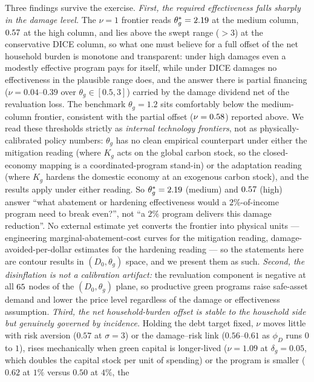 \documentclass[12pt]{article}
\begin{document}
Three findings survive the exercise. \emph{First, the required
effectiveness falls sharply in the damage level.} The $\nu=1$ frontier reads
$\theta_g^{*}=2.19$ at the medium column, $0.57$ at the
\citet{bilalkanzig2024} high column, and lies above the swept range
($>3$) at the conservative DICE column, so what one must believe for a full
offset of the net household burden is monotone and transparent: under high damages even a
modestly effective program pays for itself, while under DICE damages no
effectiveness in the plausible range does, and the answer there is
partial financing ($\nu=0.04$--$0.39$ over $\theta_g\in[0.5,3]$) carried by
the damage dividend net of the revaluation loss. The benchmark $\theta_g=1.2$
sits comfortably below the medium-column frontier, consistent with the
partial offset ($\nu=0.58$) reported above. We read these
thresholds strictly as \emph{internal technology frontiers}, not as
physically-calibrated policy numbers: $\theta_g$ has no clean empirical
counterpart under either the mitigation reading (where $K_g$ acts on the global
carbon stock, so the closed-economy mapping is a coordinated-program stand-in)
or the adaptation reading (where $K_g$ hardens the domestic economy at an
exogenous carbon stock), and the results apply under either reading. So
$\theta_g^{*}=2.19$ (medium) and $0.57$ (high) answer
``what abatement or hardening effectiveness would a $2\%$-of-income program
need to break even?'', not ``a $2\%$ program delivers this damage
reduction''. No external estimate yet converts the frontier into physical
units --- engineering marginal-abatement-cost curves for the mitigation
reading, damage-avoided-per-dollar estimates for the hardening reading ---
so the statements here are contour results in $(D_0,\theta_g)$ space, and
we present them as such. \emph{Second, the
disinflation is not a calibration artifact:} the revaluation component is
negative at all $65$
nodes of the $(D_0,\theta_g)$ plane, so productive green programs raise
safe-asset demand and lower the price level regardless of the damage or
effectiveness assumption. \emph{Third, the net household-burden offset is stable to
the household side but genuinely governed by incidence.} Holding the debt
target fixed, $\nu$ moves little with risk aversion ($0.57$ at $\sigma=3$)
or the damage--risk link ($0.56$--$0.61$ as $\phi_D$ runs $0$ to $1$), rises
mechanically when green capital is longer-lived ($\nu=1.09$ at
$\delta_g=0.05$, which doubles the capital stock per unit of spending) or
the program is smaller ($0.62$ at $1\%$ versus $0.50$ at $4\%$, the
\end{document}
